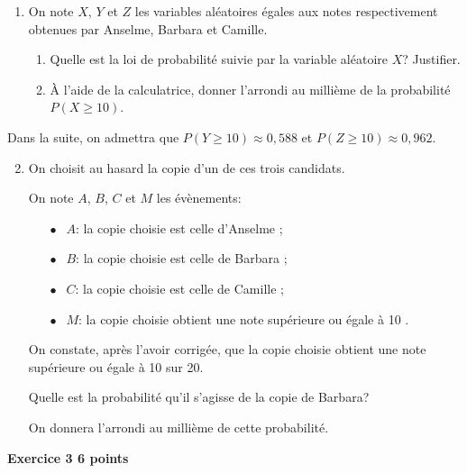\documentclass[10pt,a4paper]{article}
\begin{document}
\medskip

\begin{enumerate}
\item On note $X$, $Y$ et $Z$ les variables aléatoires égales aux notes respectivement obtenues par Anselme, Barbara et Camille.

\begin{enumerate}
\item Quelle est la loi de probabilité suivie par la variable aléatoire $X$? Justifier.
\item À l'aide de la calculatrice, donner l'arrondi au millième de la probabilité $P(X \geqslant 10)$.
\end{enumerate}
\end{enumerate}

Dans la suite, on admettra que $P(Y\geqslant 10) \approx 0,588$ et $P(Z\geqslant 10)\approx 0,962$.

\begin{enumerate}
\setcounter{enumi}{1}
\item On choisit au hasard la copie d'un de ces trois candidats.

On note $A$, $B$, $C$ et $M$ les évènements:

\setlength\parindent{15mm}
\begin{itemize}
\item[$\bullet~~$] $A$: \og la copie choisie est celle d'Anselme \fg{};
\item[$\bullet~~$] $B$: \og la copie choisie est celle de Barbara \fg{};
\item[$\bullet~~$] $C$: \og la copie choisie est celle de Camille \fg{};
\item[$\bullet~~$] $M$: \og la copie choisie obtient une note supérieure ou égale à 10 \fg{}. 
\end{itemize}
\setlength\parindent{0mm}

\smallskip

On constate, après l'avoir corrigée, que la copie choisie obtient une note supérieure ou égale à 10 sur 20.

\smallskip

Quelle est la probabilité qu'il s'agisse de la copie de Barbara?

On donnera l'arrondi au millième de cette probabilité.
\end{enumerate}

\vspace{0,25cm}

\textbf{Exercice 3 \hfill 6 points}
\end{document}
